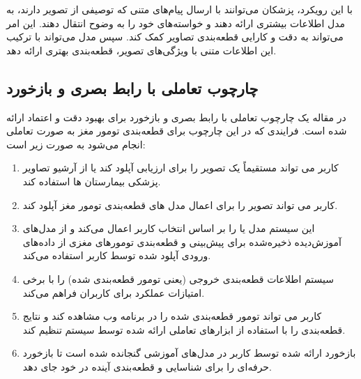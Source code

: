 با این رویکرد، پزشکان می‌توانند با ارسال پیام‌های متنی که توصیفی از تصویر دارند، به مدل اطلاعات بیشتری ارائه دهند و خواسته‌های خود را به وضوح انتقال دهند. این امر می‌تواند به دقت و کارایی قطعه‌بندی تصاویر کمک کند. سپس مدل می‌تواند با ترکیب این اطلاعات متنی با ویژگی‌های تصویر، قطعه‌بندی بهتری ارائه دهد.

\subsection{ چارچوب تعاملی با رابط بصری و بازخورد}
در مقاله \cite{sailunaz2023brain} یک چارچوب تعاملی با رابط بصری و بازخورد برای بهبود دقت و اعتماد ارائه شده است. فرایندی که در این چارچوب برای قطعه‌بندی تومور مغز به صورت تعاملی انجام می‌شود به صورت زیر است:
\begin{enumerate}
    \item کاربر می تواند مستقیماً یک تصویر را برای ارزیابی آپلود کند یا از آرشیو تصاویر پزشکی بیمارستان ها استفاده کند.
    \item کاربر می تواند تصویر را برای اعمال مدل های قطعه‌بندی تومور مغز آپلود کند.
    \item این سیستم مدل  یا  را بر اساس انتخاب کاربر اعمال می‌کند و از مدل‌های آموزش‌دیده ذخیره‌شده برای پیش‌بینی و ‌قطعه‌بندی تومورهای مغزی از داده‌های ورودی آپلود شده توسط کاربر استفاده می‌کند.
    \item سیستم اطلاعات قطعه‌بندی خروجی (یعنی تومور قطعه‌بندی شده) را با برخی امتیازات عملکرد برای کاربران فراهم می‌کند.
    \item کاربر می تواند تومور قطعه‌بندی شده را در برنامه وب مشاهده کند و نتایج قطعه‌بندی را با استفاده از ابزارهای تعاملی ارائه شده توسط سیستم تنظیم کند.
     \item بازخورد ارائه شده توسط کاربر در مدل‌های آموزشی گنجانده شده است تا بازخورد حرفه‌ای را برای شناسایی و قطعه‌بندی آینده در خود جای دهد.
\end{enumerate}
